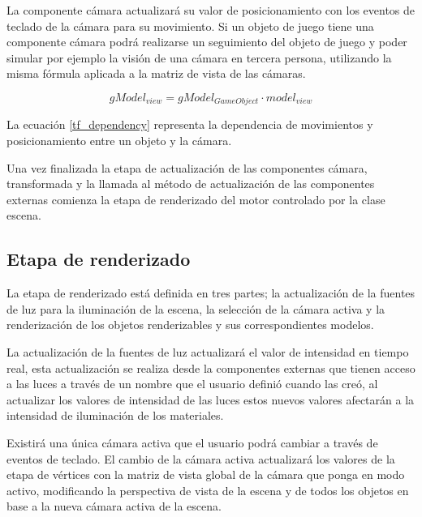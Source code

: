 \documentclass[a4paper, 17pt]{book}
\begin{document}
\vspace{1mm} %

La componente cámara actualizará su valor de posicionamiento con los eventos de teclado de la cámara para su movimiento. Si un objeto
de juego tiene una componente cámara podrá realizarse un seguimiento del objeto de juego y poder simular por ejemplo la visión de una
cámara en tercera persona, utilizando la misma fórmula aplicada a la matriz de vista de las cámaras.

\begin{equation} \label{tf_dependency}
gModel_{view} = gModel_{GameObject} \cdot model_{view}
\end{equation}

La ecuación \ref{tf_dependency} representa la dependencia de movimientos y posicionamiento entre un objeto y la cámara.

\vspace{1mm} %

Una vez finalizada la etapa de actualización de las componentes cámara, transformada y la llamada al método de actualización
de las componentes externas comienza la etapa de renderizado del motor controlado por la clase escena.

\subsection{Etapa de renderizado}
\label{subsec:renderizado}

La etapa de renderizado está definida en tres partes; la actualización de la fuentes de luz para la iluminación de la escena,
la selección de la cámara activa y la renderización de los objetos renderizables y sus correspondientes modelos.

\vspace{1mm} %

La actualización de la fuentes de luz actualizará el valor de intensidad en tiempo real, esta actualización se realiza desde
la componentes externas que tienen acceso a las luces a través de un nombre que el usuario definió cuando las creó, al
actualizar los valores de intensidad de las luces estos nuevos valores afectarán a la intensidad de iluminación de los materiales. 

\vspace{1mm} %

Existirá una única cámara activa que el usuario podrá cambiar a través de eventos de teclado. El cambio de la cámara activa
actualizará los valores de la etapa de vértices con la matriz de vista global de la cámara que ponga en modo activo,
modificando la perspectiva de vista de la escena y de todos los objetos en base a la nueva cámara activa de la escena.
\end{document}
